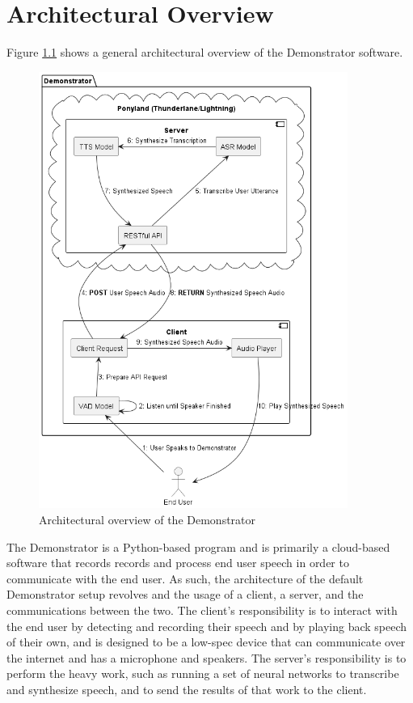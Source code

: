 
\chapter{Architectural Overview}
Figure \ref{fig:architectural_overview} shows a general architectural overview of the Demonstrator software.

\begin{figure}
    \centering
    \includegraphics[width=0.9\textwidth]{../diagrams/deployment.png}
    \caption{Architectural overview of the Demonstrator}
    \label{fig:architectural_overview}
\end{figure}

The Demonstrator is a Python-based program and is primarily a cloud-based software that records records and process end user speech in order to communicate with the end user.
As such, the architecture of the default Demonstrator setup revolves and the usage of a client, a server, and the communications between the two.
The client's responsibility is to interact with the end user by detecting and recording their speech and by playing back speech of their own, and is designed to be a low-spec device that can communicate over the internet and has a microphone and speakers.
The server's responsibility is to perform the heavy work, such as running a set of neural networks to transcribe and synthesize speech, and to send the results of that work to the client.


